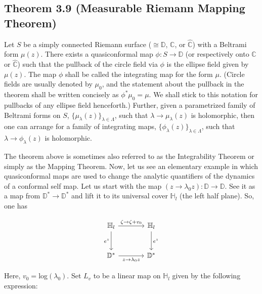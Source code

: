 \documentclass[11pt,a4paper]{article}
\begin{document}

        \subsection*{Theorem 3.9 (Measurable Riemann Mapping Theorem)} Let $S$ be a simply connected Riemann surface ($\cong \mathbb{D}$, $\mathbb{C}$, or $\hat{\mathbb{C}}$) with a Beltrami form $\mu(z)$. There exists a quasiconformal map $\phi: S \rightarrow \mathbb{D}$ (or respectively onto $\mathbb{C}$ or $\hat{\mathbb{C}}$) such that the pullback of the circle field via $\phi$ is the ellipse field given by $\mu(z)$. The map $\phi$ shall be called the integrating map for the form $\mu$. (Circle fields are usually denoted by $\mu_0$, and the statement about the pullback in the theorem shall be written concisely as $\phi^*\mu_0 = \mu$. We shall stick to this notation for pullbacks of any ellipse field henceforth.) Further, given a parametrized family of Beltrami forms on $S$, $\{\mu_{\lambda}(z)\}_{\lambda \in \Lambda}$, such that $\lambda \rightarrow \mu_{\lambda}(z)$ is holomorphic, then one can arrange for a family of integrating maps, $\{\phi_{\lambda}(z)\}_{\lambda \in \Lambda}$, such that $\lambda \rightarrow \phi_{\lambda}(z)$ is holomorphic.




        The theorem above is sometimes also referred to as the Integrability Theorem or simply as the Mapping Theorem. Now, let us see an elementary example in which quasiconformal maps are used to change the analytic quantifiers of the dynamics of a conformal self map. Let us start with the map $(z \rightarrow \lambda_0z):\mathbb{D} \rightarrow \mathbb{D}$. See it as a map from $\mathbb{D}^* \rightarrow \mathbb{D}^*$ and lift it to its universal cover $\mathbb{H}_l$ (the left half plane). So, one has

        $$\begin{tikzcd}[column sep = large, row sep = large]
        \mathbb{H}_l \arrow[r, "\zeta\rightarrow \zeta+v_0"] \arrow[d, "e^z"']
        & \mathbb{H}_l \arrow[d, "e^z"] \\
        \mathbb{D}^* \arrow[r,"z \rightarrow \lambda_0z"']
        & \mathbb{D}^*
        \end{tikzcd}$$


        Here, $v_0 =$log$(\lambda_0)$. Set $L_v$ to be a linear map on $\mathbb{H}_l$ given by the following expression:
\end{document}
